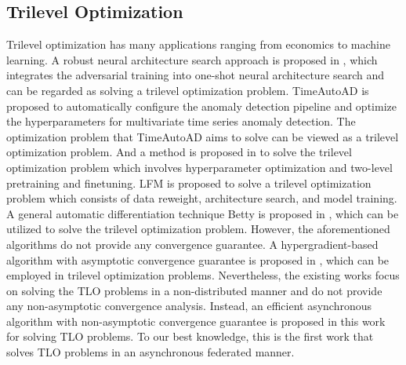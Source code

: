 \documentclass[letterpaper]{article} %
\begin{document}
\subsection{Trilevel Optimization}
Trilevel optimization has many applications ranging from economics to machine learning. A robust neural architecture search approach is proposed in \cite{guo2020meets}, which integrates the adversarial training into one-shot neural architecture search and can be regarded as solving a trilevel optimization problem. TimeAutoAD \cite{jiao2022timeautoad} is proposed to automatically configure the anomaly detection pipeline and optimize the hyperparameters for multivariate time series anomaly detection. The optimization problem that TimeAutoAD aims to solve can be viewed as a trilevel optimization problem. And a method is proposed in \cite{raghu2021meta} to solve the trilevel optimization problem which involves hyperparameter optimization and two-level pretraining and finetuning. LFM \cite{garg2022learning} is proposed to solve a trilevel optimization problem which consists of data reweight, architecture search, and model training. A general automatic differentiation technique Betty is proposed in \cite{choe2022betty}, which can be utilized to solve the trilevel optimization problem. However, the aforementioned algorithms do not provide any convergence guarantee. A hypergradient-based algorithm with asymptotic convergence guarantee is proposed in \cite{sato2021gradient}, which can be employed in trilevel optimization problems. Nevertheless, the existing works focus on solving the TLO problems in a non-distributed manner and do not provide any non-asymptotic convergence analysis. Instead, an efficient asynchronous algorithm with non-asymptotic convergence guarantee is proposed in this work for solving TLO problems. To our best knowledge, this is the first work that solves TLO problems in an asynchronous federated manner.
\end{document}
